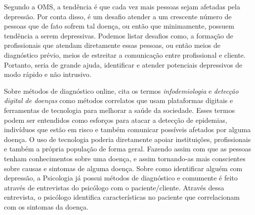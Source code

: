 
Segundo a OMS, a tendência é que cada vez mais pessoas sejam afetadas pela depressão. Por conta disso, é um desafio atender a um crescente número de pessoas que de fato sofrem tal doença, ou então que minimamente, possuem tendência a serem depressivas. Podemos listar desafios como, a formação de profissionais que atendam diretamente essas pessoas, ou então meios de diagnóstico prévio, meios de estreitar a comunicação entre profissional e cliente. Portanto, seria de grande ajuda, identificar e atender potenciais depressivos de modo rápido e não intrusivo.

Sobre métodos de diagnóstico online, \cite{Horvitz} cita os termos \textit{infodemiologia} e \emph{detecção digital de doenças} como métodos correlatos que usam plataformas digitais e ferramentas de tecnologia para melhorar a saúde da sociedade. Esses termos podem ser entendidos como esforços para atacar a detecção de epidemias, indivíduos que estão em risco e também comunicar possíveis afetados por alguma doença. O uso de tecnologia poderia diretamente apoiar instituições, profissionais e também a própria população de forma geral. Fazendo assim com que as pessoas tenham conhecimentos sobre uma doença, e assim tornando-as mais conscientes sobre causas e sintomas de alguma doença.
Sobre como identificar alguém com depressão, a Psicologia já possui métodos de diagnóstico e comumente é feito através de entrevistas do psicólogo com o paciente/cliente. Através dessa entrevista, o psicólogo identifica características no paciente que correlacionam com os sintomas da doença.

